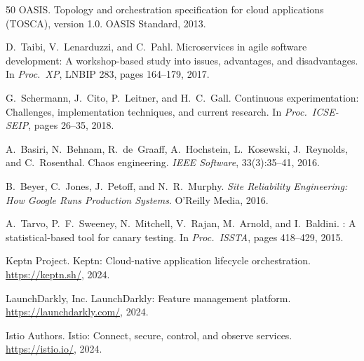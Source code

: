 \documentclass[10pt,twocolumn]{article}
\begin{document}
\begin{thebibliography}{50}
{OASIS}.
\newblock Topology and orchestration specification for cloud applications ({TOSCA}), version 1.0.
\newblock OASIS Standard, 2013.

D.~Taibi, V.~Lenarduzzi, and C.~Pahl.
\newblock Microservices in agile software development: A workshop-based study into issues, advantages, and disadvantages.
\newblock In \emph{Proc.\ XP}, LNBIP 283, pages 164--179, 2017.

G.~Schermann, J.~Cito, P.~Leitner, and H.~C.~Gall.
\newblock Continuous experimentation: Challenges, implementation techniques, and current research.
\newblock In \emph{Proc.\ ICSE-SEIP}, pages 26--35, 2018.

A.~Basiri, N.~Behnam, R.~de~Graaff, A.~Hochstein, L.~Kosewski, J.~Reynolds, and C.~Rosenthal.
\newblock Chaos engineering.
\newblock \emph{IEEE Software}, 33(3):35--41, 2016.

B.~Beyer, C.~Jones, J.~Petoff, and N.~R.~Murphy.
\newblock \emph{Site Reliability Engineering: How Google Runs Production Systems}.
\newblock O'Reilly Media, 2016.

A.~Tarvo, P.~F.~Sweeney, N.~Mitchell, V.~Rajan, M.~Arnold, and I.~Baldini.
: A statistical-based tool for canary testing.
\newblock In \emph{Proc.\ ISSTA}, pages 418--429, 2015.

{Keptn Project}.
\newblock Keptn: Cloud-native application lifecycle orchestration.
\newblock \url{https://keptn.sh/}, 2024.

{LaunchDarkly, Inc.}
\newblock LaunchDarkly: Feature management platform.
\newblock \url{https://launchdarkly.com/}, 2024.

{Istio Authors}.
\newblock Istio: Connect, secure, control, and observe services.
\newblock \url{https://istio.io/}, 2024.

\end{thebibliography}
\end{document}
